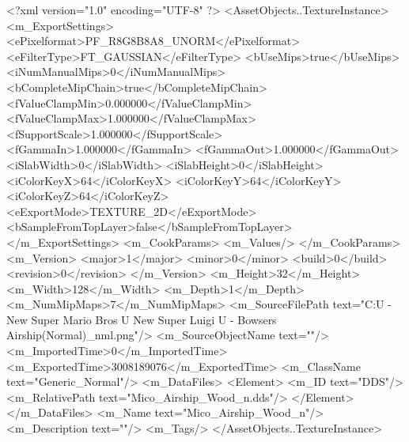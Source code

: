 <?xml version="1.0" encoding="UTF-8" ?>
<AssetObjects..TextureInstance>
	<m_ExportSettings>
		<ePixelformat>PF_R8G8B8A8_UNORM</ePixelformat>
		<eFilterType>FT_GAUSSIAN</eFilterType>
		<bUseMips>true</bUseMips>
		<iNumManualMips>0</iNumManualMips>
		<bCompleteMipChain>true</bCompleteMipChain>
		<fValueClampMin>0.000000</fValueClampMin>
		<fValueClampMax>1.000000</fValueClampMax>
		<fSupportScale>1.000000</fSupportScale>
		<fGammaIn>1.000000</fGammaIn>
		<fGammaOut>1.000000</fGammaOut>
		<iSlabWidth>0</iSlabWidth>
		<iSlabHeight>0</iSlabHeight>
		<iColorKeyX>64</iColorKeyX>
		<iColorKeyY>64</iColorKeyY>
		<iColorKeyZ>64</iColorKeyZ>
		<eExportMode>TEXTURE_2D</eExportMode>
		<bSampleFromTopLayer>false</bSampleFromTopLayer>
	</m_ExportSettings>
	<m_CookParams>
		<m_Values/>
	</m_CookParams>
	<m_Version>
		<major>1</major>
		<minor>0</minor>
		<build>0</build>
		<revision>0</revision>
	</m_Version>
	<m_Height>32</m_Height>
	<m_Width>128</m_Width>
	<m_Depth>1</m_Depth>
	<m_NumMipMaps>7</m_NumMipMaps>
	<m_SourceFilePath text="C:\Users\micka\Downloads\Wii U - New Super Mario Bros U New Super Luigi U - Bowsers Airship\Airship\Airship (Normal)\Wood_nml.png"/>
	<m_SourceObjectName text=""/>
	<m_ImportedTime>0</m_ImportedTime>
	<m_ExportedTime>3008189076</m_ExportedTime>
	<m_ClassName text="Generic_Normal"/>
	<m_DataFiles>
		<Element>
			<m_ID text="DDS"/>
			<m_RelativePath text="Mico_Airship_Wood_n.dds"/>
		</Element>
	</m_DataFiles>
	<m_Name text="Mico_Airship_Wood_n"/>
	<m_Description text=""/>
	<m_Tags/>
</AssetObjects..TextureInstance>

